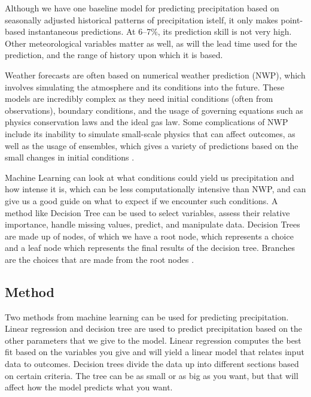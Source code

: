 \documentclass[11pt]{report}
\begin{document}


Although we have one baseline model for predicting precipitation based on
seasonally adjusted historical patterns of precipitation istelf, it only
makes point-based instantaneous predictions.  At 6--7\%, its prediction
skill is not very high. Other meteorological variables matter as well, as
will the lead time used for the prediction, and the range of history upon
which it is based.


Weather forecasts are often based on numerical weather prediction (NWP),
which involves simulating the atmosphere and its conditions into the
future. These models are incredibly complex as they need initial conditions
(often from observations), boundary conditions, and the usage of governing
equations such as physics conservation laws and the ideal gas law. Some
complications of NWP include its inability to simulate small-scale physics
that can affect outcomes, as well as the usage of ensembles, which gives a
variety of predictions based on the small changes in initial conditions
\cite[]{NWP}.

Machine Learning can look at what conditions could yield us precipitation
and how intense it is, which can be less computationally intensive than NWP,
and can give us a good guide on what to expect if we encounter such
conditions.  A method like Decision Tree can be used to select variables,
assess their relative importance, handle missing values, predict, and
manipulate data. Decision Trees are made up of nodes, of which we have a
root node, which represents a choice and a leaf node which represents the
final results of the decision tree. Branches are the choices that are made
from the root nodes \cite[]{DT}.


\subsection{Method}

Two methods from machine learning can be used for predicting
precipitation. Linear regression and decision tree are used to predict
precipitation based on the other parameters that we give to the
model. Linear regression computes the best fit based on the variables you
give and will yield a linear model that relates input data to outcomes.
Decision trees divide the data up into different sections based on certain
criteria. The tree can be as small or as big as you want, but that will
affect how the model predicts what you want.
\end{document}
